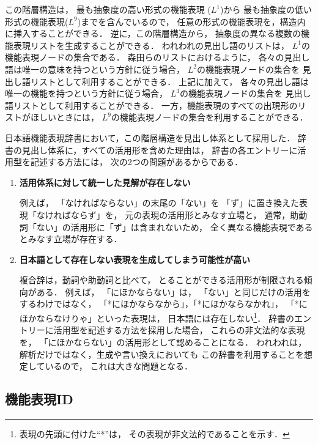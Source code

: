 \documentclass[japanese]{jnlp_1.3e}
\begin{document}
この階層構造は，
最も抽象度の高い形式の機能表現 ($L^1$)から
最も抽象度の低い形式の機能表現($L^9$)までを含んでいるので，
任意の形式の機能表現を，構造内に挿入することができる．
逆に，この階層構造から，
抽象度の異なる複数の機能表現リストを生成することができる．
われわれの見出し語のリストは，
$L^1$の機能表現ノードの集合である．
森田らのリストにおけるように，
各々の見出し語は唯一の意味を持つという方針に従う場合，
$L^2$の機能表現ノードの集合を
見出し語リストとして利用することができる．
上記に加えて，
各々の見出し語は唯一の機能を持つという方針に従う場合，
$L^3$の機能表現ノードの集合を
見出し語リストとして利用することができる．
一方，機能表現のすべての出現形のリストがほしいときには，
$L^9$の機能表現ノードの集合を利用することができる．

日本語機能表現辞書において，この階層構造を見出し体系として採用した．
辞書の見出し体系に，すべての活用形を含めた理由は，
辞書の各エントリーに活用型を記述する方法には，
次の2つの問題があるからである．
\begin{enumerate}
\item {\bf 活用体系に対して統一した見解が存在しない}

      例えば，
      「なければならない」の末尾の「ない」を
      「ず」に置き換えた表現「なければならず」を，
      元の表現の活用形とみなす立場と，
      通常，助動詞「ない」の活用形に「ず」は含まれないため，
      全く異なる機能表現であるとみなす立場が存在する．

\item {\bf 日本語として存在しない表現を生成してしまう可能性が高い}

      複合辞は，動詞や助動詞と比べて，
      とることができる活用形が制限される傾向がある．
      例えば，
      「にほかならない」は，
      「ない」と同じだけの活用をするわけではなく，
      \mbox{「*にほかならなから」}，「*にほかならなかれ」，
      「*にほかならなけりゃ」といった表現は，
      日本語には存在しない\footnote{表現の先頭に付けた``*''は，
      その表現が非文法的であることを示す．}．
      辞書のエントリーに活用型を記述する方法を採用した場合，
      これらの非文法的な表現を，
      「にほかならない」の活用形として認めることになる．
      われわれは，
      解析だけではなく，生成や言い換えにおいても
      この辞書を利用することを想定しているので，
      これは大きな問題となる．
\end{enumerate}

\subsection{機能表現ID}
\label{subsec:id}
\end{document}
